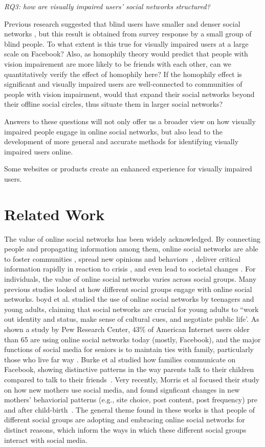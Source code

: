 \documentclass{sigchi}
\begin{document}
\emph{RQ3: how are visually impaired users' social networks structured? }

Previous research suggested that blind users have smaller and denser social networks \cite{brady2013cscw}, but this result is obtained from survey response by a small group of blind people. To what extent is this true for visually impaired users at a large scale on Facebook? Also, as homophily theory would predict that people with vision impairement are more likely to be friends with each other, can we quantitatively verify the effect of homophily here? If the homophily effect is significant and visually impaired users are well-connected to communities of people with vision impairment, would that expand their social networks beyond their offline social circles, thus situate them in larger social networks? 


Answers to these questions will not only offer us a broader view on how  visually impaired people engage in online social networks, but also lead to the development of more general and accurate methods for identifying visually impaired users online. 

Some websites or products create an enhanced experience for visually impaired users.


\section{Related Work}

The value of online social networks has been widely acknowledged. By connecting people and propagating    information among them, online social networks are able to foster communities \cite{backstrom2006}, spread new opinions and behaviors~\cite{romero2011,wu2011}, deliver critical information rapidly in reaction to crisis \cite{Goolsby:2010}, and even lead to societal changes \cite{weber2013}.  For individuals, the value of online social networks varies across social groups. Many previous studies looked at how different social groups engage with online social networks. boyd et al. \cite{boyd2007} studied the use of online social networks by teenagers and young adults, claiming that social networks are crucial for young adults to ``work out identity and status, make sense of cultural cues, and negotiate public life'. As shown a study by Pew Research Center, $43\%$ of American Internet users older than 65 are using online social networks today (mostly, Facebook), and the major functions of social media for seniors is to maintain ties with family, particularly those who live far way \cite{pew_seniors}. Burke et al studied how families communicate on Facebook, showing distinctive patterns in the way parents talk to their children compared to talk to their friends~\cite{burke2013}.  Very recently, Morris et al focused their study on how new mothers use social media, and found signficant changes in new mothers' behaviorial patterns (e.g., site choice, post content, post frequency) pre and after child-birth~\cite{morris2014}. The general theme found in these works is that people of different social groups are adopting and embracing online social networks for distinct reasons, which inform the ways in which these different social groups interact with social media. 
\end{document}
